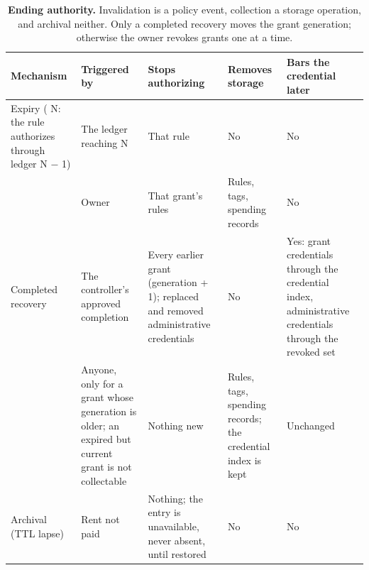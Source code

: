 \begin{table}[tbp]
\centering
\caption{\textbf{Ending authority.} Invalidation is a policy event, collection a storage operation, and archival neither. Only a completed recovery moves the grant generation; otherwise the owner revokes grants one at a time.}\label{tab:tab-ending}
\footnotesize\begin{tabularx}{\linewidth}{@{}LLLLL@{}}
\toprule
\textbf{Mechanism} & \textbf{Triggered by} & \textbf{Stops authorizing} & \textbf{Removes storage} & \textbf{Bars the credential later} \\
\midrule
Expiry ( N: the rule authorizes through ledger N \ensuremath{-} 1) & The ledger reaching N & That rule & No & No \\
 & Owner & That grant's rules & Rules, tags, spending records & No \\
Completed recovery & The controller's approved completion & Every earlier grant (generation + 1); replaced and removed administrative credentials & No & Yes: grant credentials through the credential index, administrative credentials through the revoked set \\
 & Anyone, only for a grant whose generation is older; an expired but current grant is not collectable & Nothing new & Rules, tags, spending records; the credential index is kept & Unchanged \\
Archival (TTL lapse) & Rent not paid & Nothing; the entry is unavailable, never absent, until restored & No & No \\
\bottomrule
\end{tabularx}
\end{table}

